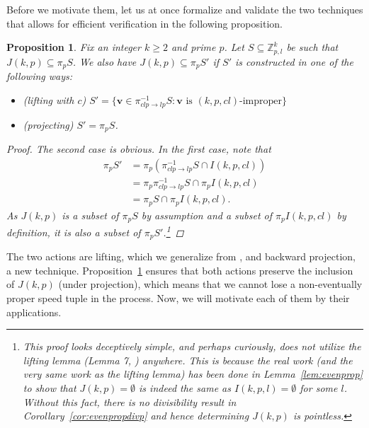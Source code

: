 \documentclass[11pt]{amsart}
\newcommand{\Z}{\mathbb{Z}}
\newcommand{\vbf}{\mathbf{v}}
\newtheorem{proposition}[theorem]{Proposition}
\theoremstyle{definition}
\theoremstyle{remark}
\begin{document}
Before we motivate them, let us at once formalize and validate the two techniques that allows for efficient verification in the following proposition.
\begin{proposition}
\label{prop:liftproj} 
    Fix an integer $k \ge 2$ and prime $p$.
    Let $S\subseteq\Z_{p,l}^k$ be such that $J(k,p)\subseteq\pi_{p}S$. 
    We also have $J(k,p)\subseteq\pi_pS'$ if $S'$ is constructed in one of the following ways:
    \begin{itemize}
        \item (lifting with $c$) $S'=\{\vbf\in\pi_{clp\rightarrow lp}^{-1}S:\vbf\text{ is $(k,p,cl)$-improper}\}$
        \item (projecting) $S'=\pi_pS$.
    \end{itemize}
    \begin{proof}
        The second case is obvious. In the first case, note that
        \[\begin{split}
            \pi_pS'&=\pi_p \left( \pi_{clp\rightarrow lp}^{-1}S\cap I(k,p,cl) \right) \\
                   &=\pi_p\pi_{clp\rightarrow lp}^{-1}S\cap\pi_pI(k,p,cl) \\
                   &=\pi_pS\cap\pi_pI(k,p,cl).
        \end{split} \] 
        As $J(k,p)$ is a subset of $\pi_pS$ by assumption and a subset of $\pi_pI(k,p,cl)$ by definition, 
        it is also a subset of $\pi_pS'$.\footnote{This proof looks deceptively simple, and perhaps curiously, 
          does not utilize the lifting lemma (Lemma 7,  \cite{Trakulthongchai}) anywhere. 
          This is because the real work (and the very same work as the lifting lemma) has been done 
          in Lemma~\ref{lem:evenprop} to show that 
          $J(k,p)=\emptyset$ is indeed the same as $I(k,p,l)=\emptyset$ for some $l$. 
          Without this fact, there is no divisibility result in Corollary~\ref{cor:evenpropdivp} 
          and hence determining $J(k,p)$ is pointless.
        }
    \end{proof}
\end{proposition}

The two actions are lifting, which we generalize from \cite{Trakulthongchai}, and backward projection, a new technique.
Proposition~\ref{prop:liftproj} ensures that both actions preserve the inclusion of $J(k,p)$ (under projection), 
which means that we cannot lose a non-eventually proper speed tuple in the process. 
Now, we will motivate each of them by their applications.
\end{document}
